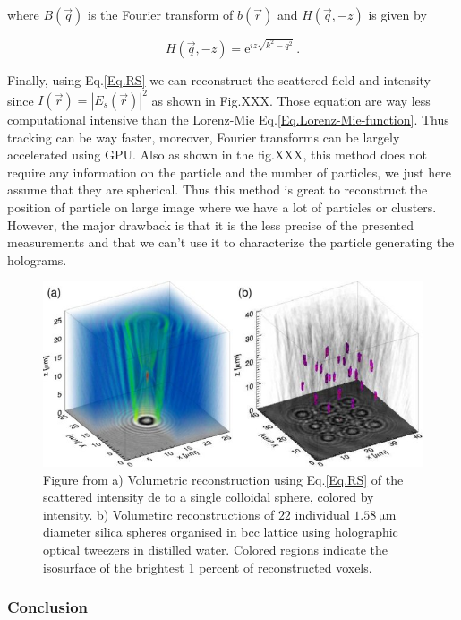 where $B(\vec{q})$ is the Fourier transform of $b(\vec{r})$ and $H(\vec{q}, -z)$ is given by

\begin{equation}
	H(\vec{q}, -z) = \mathrm{e}^{iz \sqrt{k^2 - q^2}} ~.
\end{equation}

Finally, using Eq.\ref{Eq.RS} we can reconstruct the scattered field and intensity since $I(\vec{r}) = |E_s(\vec{r})|^2$ as shown in Fig.XXX. 
Those equation are way less computational intensive than the Lorenz-Mie Eq.\ref{Eq.Lorenz-Mie-function}. Thus tracking can be way faster, moreover, Fourier transforms can be largely accelerated using GPU. Also as shown in the fig.XXX, this method does not require any information on the particle and the number of particles, we just here assume that they are spherical. Thus this method is great to reconstruct the position of particle on large image where we have a lot of particles or clusters. However, the major drawback is that it is the less precise of the presented measurements and that we can't use it to characterize the particle generating the holograms.

\begin{figure}[h!]
	\centering
	\includegraphics[scale=2]{02_body/chapter2/images/sommerfel_demo.jpg}
	\caption{Figure from \cite{cheong_strategies_2010} a) Volumetric reconstruction using Eq.\ref{Eq.RS} of the scattered intensity de to a single colloidal sphere, colored by intensity. b) Volumetirc reconstructions of $22$ individual $1.58 ~ \mathrm{\mu m}$ diameter silica spheres organised in bcc lattice using holographic optical tweezers in distilled water. Colored regions indicate the isosurface of the brightest 1 percent of reconstructed voxels.}
	\label{fig.sommerfeld}
\end{figure}



\subsubsection{Conclusion}

